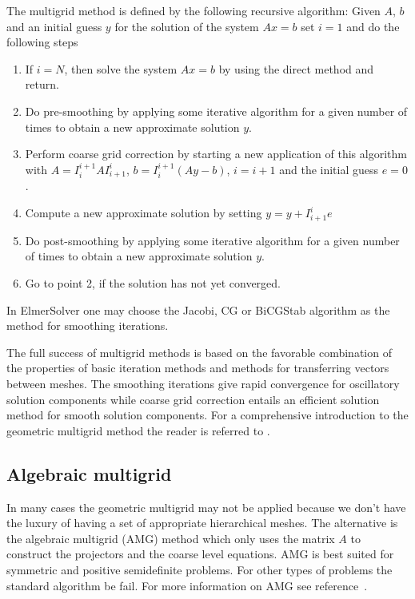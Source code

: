 \begin{versiona}
The multigrid method is defined by the following recursive algorithm: 
Given $A$, $b$ and an initial guess $y$ for the solution of the system $Ax=b$ set $i=1$ 
and do the following steps  
\begin{enumerate}
\item If $i=N$, then solve the system $Ax=b$ by using the direct method
	and return.
\item Do pre-smoothing by applying some iterative algorithm 
for a given number of times to obtain a new approximate solution $y$.
\item Perform coarse grid correction by starting 
	a new application of this algorithm with 
	$A=I_{i}^{i+1}AI_{i+1}^{i}$, $b=I_{i}^{i+1}(Ay-b)$,	
	$i=i+1$ and the initial guess $e=0$.
\item Compute a new approximate solution by setting $y = y + I_{i+1}^{i}e$
\item Do post-smoothing by applying some iterative algorithm for a given number of times
	to obtain a new approximate solution $y$.
\item Go to point 2, if the solution has not yet converged.
\end{enumerate}
In ElmerSolver one may choose the Jacobi, CG or BiCGStab algorithm as the method for smoothing
iterations. 

The full success of multigrid methods is based on the favorable combination of the properties 
of basic iteration methods and methods for transferring vectors between meshes. 
The smoothing iterations give rapid convergence for    
oscillatory solution components while coarse grid correction entails an efficient 
solution method for smooth solution components. For a comprehensive 
introduction to the geometric multigrid method the reader is referred to \cite{Briggs87}.     





\subsection{Algebraic multigrid}

In many cases the geometric multigrid may not be applied because we don't have the 
luxury of having a set of appropriate hierarchical meshes. The alternative is the 
algebraic multigrid (AMG) method which only uses the matrix $A$ to construct the projectors and the 
coarse level equations. AMG is best suited for symmetric and positive semidefinite problems.
For other types of problems the standard algorithm be fail. For more information on 
AMG see reference~\cite{stuben99}. 
 

\end{versiona}
